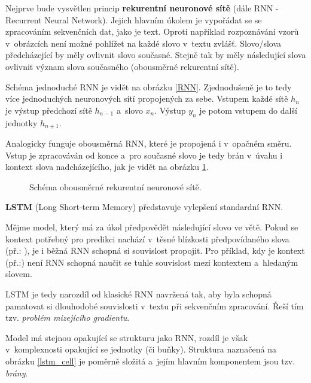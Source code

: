 Nejprve bude vysvětlen princip \textbf{rekurentní neuronové sítě} (dále RNN - Recurrent Neural Network).
Jejich hlavním úkolem je vypořádat se se zpracováním sekvenčních dat, jako je text. Oproti například rozpoznávání vzorů v~obrázcích není možné pohlížet na každé slovo v~textu zvlášť. Slovo/slova předcházející by měly ovlivnit slovo současné. Stejně tak by měly následující slova ovlivnit význam slova současného (obousměrné rekurentní sítě).\par
Schéma jednoduché RNN je vidět na obrázku \ref{RNN}. Zjednodušeně je to tedy více jednoduchých neuronových sítí propojených za sebe. Vstupem každé sítě $h_n$ je výstup předchozí sítě $h_{n-1}$ a~slovo $x_n$. Výstup $y_n$ je potom vstupem do další jednotky $h_{n+1}$.\par
Analogicky funguje obousměrná RNN, které je propojená i v~opačném směru. Vstup je zpracováván od konce a~pro současné slovo je tedy brán v~úvahu i kontext slova nadcházejícího, jak je vidět na obrázku \ref{bidirRNN}.\par

\begin{figure}[hbt]
    \centering
	\caption{Schéma obousměrné rekurentní neuronové sítě.}
	\label{bidirRNN}
\end{figure}

\pagebreak\textbf{LSTM} (Long Short-term Memory) představuje vylepšení standardní RNN.\par \smallskip
Mějme model, který má za úkol předpovědět následující slovo ve větě. Pokud se kontext potřebný pro predikci nachází v~těsné blízkosti předpovídaného slova (př.: ), je i běžná RNN schopná si souvislost propojit. Pro příklad, kdy je kontext  (př.:) není RNN schopná naučit se tuhle souvislost mezi kontextem a~hledaným slovem.\par \smallskip
LSTM je tedy narozdíl od klasické RNN navržená tak, aby byla schopná pamatovat si dlouhodobé souvislosti v~textu při sekvenčním zpracování. Řeší tím tzv. \emph{problém mizejícího gradientu}.\par
Model má stejnou opakující se strukturu jako RNN, rozdíl je však v~komplexnosti opakující se jednotky (či buňky). Struktura naznačená na obrázku \ref{lstm_cell} je poměrně složitá a~jejím hlavním komponentem jsou tzv. \emph{brány}. 

